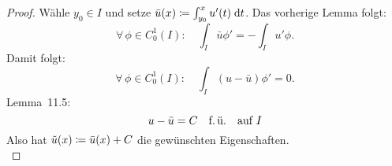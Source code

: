 \begin{proof}
    Wähle $y_0\in I$ und setze $\bar u(x) \defeq \int_{y_0}^x u'(t)\dif{t}$.
    Das vorherige Lemma %
    folgt:
    \[ \forall\,\phi\in C_0^1(I)\colon\quad
        \int_I \bar u \phi' = -\int_I u'\phi
    . \]
    Damit folgt:
    \[ \forall\,\phi\in C_0^1(I)\colon\quad
        \int_I (u-\bar u) \phi' = 0
    . \]
    Lemma~11.5:
    \[ u-\bar u = C \mfu \text{\quad auf $I$} \]
    Also hat $\tilde u(x) \defeq \bar u(x) + C$ die gewünschten Eigenschaften.
    \\
\end{proof}
